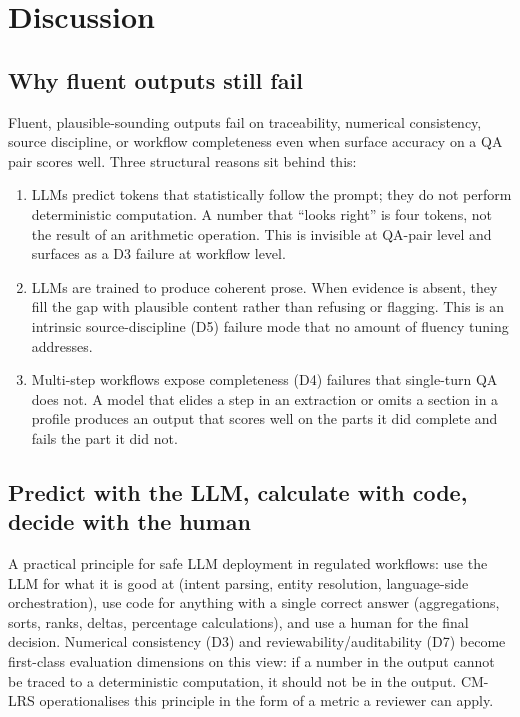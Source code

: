 \documentclass[11pt]{article}
\begin{document}
\section{Discussion}
\label{sec:discussion}

\subsection{Why fluent outputs still fail}

Fluent, plausible-sounding outputs fail on traceability, numerical consistency, source discipline, or workflow completeness even when surface accuracy on a QA pair scores well. Three structural reasons sit behind this:

\begin{enumerate}[leftmargin=*,itemsep=0.2em]
\item LLMs predict tokens that statistically follow the prompt; they do not perform deterministic computation. A number that ``looks right'' is four tokens, not the result of an arithmetic operation. This is invisible at QA-pair level and surfaces as a D3 failure at workflow level.
\item LLMs are trained to produce coherent prose. When evidence is absent, they fill the gap with plausible content rather than refusing or flagging. This is an intrinsic source-discipline (D5) failure mode that no amount of fluency tuning addresses.
\item Multi-step workflows expose completeness (D4) failures that single-turn QA does not. A model that elides a step in an extraction or omits a section in a profile produces an output that scores well on the parts it did complete and fails the part it did not.
\end{enumerate}

\subsection{Predict with the LLM, calculate with code, decide with the human}

A practical principle for safe LLM deployment in regulated workflows: use the LLM for what it is good at (intent parsing, entity resolution, language-side orchestration), use code for anything with a single correct answer (aggregations, sorts, ranks, deltas, percentage calculations), and use a human for the final decision. Numerical consistency (D3) and reviewability/auditability (D7) become first-class evaluation dimensions on this view: if a number in the output cannot be traced to a deterministic computation, it should not be in the output. CM-LRS operationalises this principle in the form of a metric a reviewer can apply.
\end{document}
